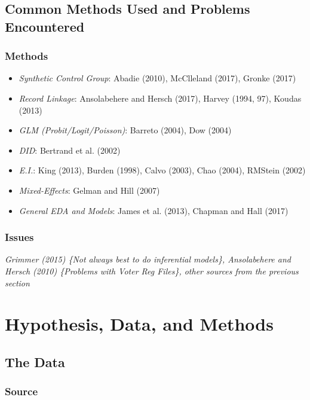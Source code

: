 \documentclass[12pt,twoside]{reedthesis}
\providecommand{\tightlist}{%
  \setlength{\itemsep}{0pt}\setlength{\parskip}{0pt}}
\begin{document}
  \section{Common Methods Used and Problems
  Encountered}\label{common-methods-used-and-problems-encountered}
  
  \subsection{Methods}\label{methods}
  
  \begin{itemize}
  \tightlist
  \item
    \emph{Synthetic Control Group}: Abadie (2010), McClleland (2017),
    Gronke (2017)
  \item
    \emph{Record Linkage}: Ansolabehere and Hersch (2017), Harvey (1994,
    97), Koudas (2013)
  \item
    \emph{GLM (Probit/Logit/Poisson)}: Barreto (2004), Dow (2004)
  \item
    \emph{DID}: Bertrand et al. (2002)
  \item
    \emph{E.I.}: King (2013), Burden (1998), Calvo (2003), Chao (2004),
    RMStein (2002)
  \item
    \emph{Mixed-Effects}: Gelman and Hill (2007)
  \item
    \emph{General EDA and Models}: James et al. (2013), Chapman and Hall
    (2017)
  \end{itemize}
  
  \subsection{Issues}\label{issues}
  
  \emph{Grimmer (2015) \{Not always best to do inferential models\},
  Ansolabehere and Hersch (2010) \{Problems with Voter Reg Files\}, other
  sources from the previous section}
  
  \chapter{Hypothesis, Data, and
  Methods}\label{hypothesis-data-and-methods}
  
  \section{The Data}\label{the-data}
  
  \subsection{Source}\label{source}
  
\end{document}

